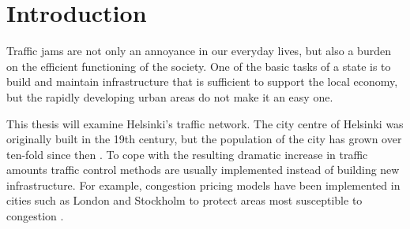 \documentclass[english, 12pt, a4paper, elec, utf8, pdfa, online]{aaltothesis}
\begin{document}



\cleardoublepage

\section{Introduction}

\thispagestyle{empty}

Traffic jams are not only an annoyance in our everyday lives, but also a burden on the efficient functioning of the society. One of the basic tasks of a state is to build and maintain infrastructure that is sufficient to support the local economy, but the rapidly developing urban areas do not make it an easy one.

This thesis will examine Helsinki's traffic network. The city centre of Helsinki was originally built in the 19th century, but the population of the city has grown over ten-fold since then \cite{helsinki}. To cope with the resulting dramatic increase in traffic amounts traffic control methods are usually implemented instead of building new infrastructure. For example, congestion pricing models have been implemented in cities such as London and Stockholm to protect areas most susceptible to congestion \cite{congestionpricing}.
\end{document}
